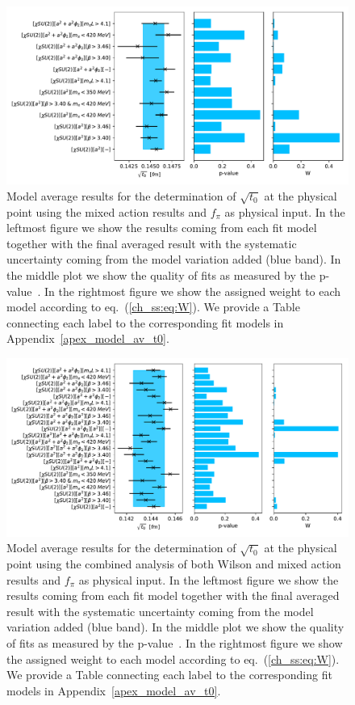 \begin{figure}
    \centering
    \includegraphics[width=1.\textwidth]{./cap5/figs/BMA_SU2_tm.pdf}
    \caption{Model average results for the determination of $\sqrt{t_0}$ at the physical point using the mixed action results and $f_{\pi}$ as physical input. In the leftmost figure we show the results coming from each fit model together with the final averaged result with the systematic uncertainty coming from the model variation added (blue band). In the middle plot we show the quality of fits as measured by the p-value~\citep{Bruno:2022mfy}. In the rightmost figure we show the assigned weight to each model according to eq.~(\ref{ch_ss:eq:W}). We provide a Table connecting each label to the corresponding fit models in Appendix~\ref{apex_model_av_t0}.}
    \label{ch_ss:fig:BMA_tm_SU2}
\end{figure}

\begin{figure}
    \centering
    \includegraphics[width=1.\textwidth]{./cap5/figs/BMA_SU2_comb.pdf}
    \caption{Model average results for the determination of $\sqrt{t_0}$ at the physical point using the combined analysis of both Wilson and mixed action results and $f_{\pi}$ as physical input. In the leftmost figure we show the results coming from each fit model together with the final averaged result with the systematic uncertainty coming from the model variation added (blue band). In the middle plot we show the quality of fits as measured by the p-value~\citep{Bruno:2022mfy}. In the rightmost figure we show the assigned weight to each model according to eq.~(\ref{ch_ss:eq:W}). We provide a Table connecting each label to the corresponding fit models in Appendix~\ref{apex_model_av_t0}.}
    \label{ch_ss:fig:BMA_comb_SU2}
\end{figure}

